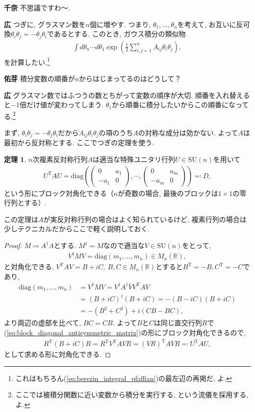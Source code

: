 \documentclass{ltjsarticle}
\theoremstyle{definition}
\newtheorem*{dfn}{定理}
\newcommand{\parno}{\par\noindent}
\begin{document}
\textbf{千奈} 不思議ですわ〜.\parno
\textbf{広} つぎに, グラスマン数を$n$個に増やす. つまり, $\theta_1,\dots,\theta_n$を考えて, お互いに反可換$\theta_i\theta_j=-\theta_j\theta_i$であるとする. このとき, ガウス積分の類似物
\begin{gather}
  \int d\theta_n\cdots d\theta_1\exp\left(\frac12\sum_{i,j=1}^nA_{ij}\theta_i\theta_j\right),\label{eq:gaussian_integral_grassmann_number}
\end{gather}
を計算したい.\footnote{これはもちろん(\ref{eq:berezin_integral_pfaffian})の最左辺の再掲だ, よ.}\parno
\textbf{佑芽} 積分変数の順番が$n$からはじまってるのはどうして？\parno
\textbf{広} グラスマン数ではふつうの数とちがって変数の順序が大切. 順番を入れ替えると$-1$倍だけ値が変わってしまう. $\theta_1$から順番に積分したいからこの順番になってる.\footnote{ここでは被積分関数に近い変数から積分を実行する, という流儀を採用する, よ.}\par
まず, $\theta_i\theta_j=-\theta_j\theta_i$だから$A_{ij}\theta_i\theta_j$の項のうち$A$の対称な成分は効かない. よって$A$は最初から反対称とする. ここでつぎの定理を使う.
\begin{dfn}
$n$次複素反対称行列$A$は適当な特殊ユニタリ行列$U\in\mathrm{SU}(n)$を用いて
\begin{gather}
  U^{\mathrm T}AU=\mathrm{diag}\left(
  \begin{pmatrix}
    0&a_1\\-a_1&0
  \end{pmatrix}
  ,\cdots,
  \begin{pmatrix}
    0&a_m\\-a_m&0
  \end{pmatrix}
  \right)\eqqcolon D,\label{eq:block_diagonal_antisymmetric_matrix}
\end{gather}
という形にブロック対角化できる（$n$が奇数の場合, 最後のブロックは$1\times1$の零行列とする）.
\end{dfn}
この定理は$A$が実反対称行列の場合はよく知られているけど, 複素行列の場合は少しテクニカルだからここで軽く説明しておく. 
\begin{proof}
  $M\coloneqq A^\dagger A$とする. $M^\dagger =M$なので適当な$V\in\mathrm{SU}(n)$をとって,
  \begin{gather}
    V^\dagger MV=\mathrm{diag}(m_1,\dots,m_n)\in M_n(\mathbb R),
  \end{gather}
  と対角化できる. $V^{\mathrm T}AV=B+iC,\ B,C\in M_n(\mathbb R)$とすると$B^{\mathrm T}=-B, C^{\mathrm T}=-C$であり,
  \begin{align}
    \mathrm{diag}(m_1,\dots,m_n)&=V^\dagger MV=V^\dagger A^\dagger\bar VV^{\mathrm T}AV\\
    &=(B+iC)^\dagger(B+iC)=-(B-iC)(B+iC)\\
    &=-(B^2+C^2)+i(CB-BC),
  \end{align}
  より両辺の虚部を比べて, $BC=CB$. よって$B$と$C$は同じ直交行列$R$で(\ref{eq:block_diagonal_antisymmetric_matrix})の形にブロック対角化できるので,
  \begin{gather}
    R^{\mathrm T}(B+iC)R=R^{\mathrm T}V^{\mathrm T}AVR=(VR)^{\mathrm T}AVR\eqqcolon U^{\mathrm T}AU,
  \end{gather}
  として求める形に対角化できる.
\end{proof}
\end{document}
